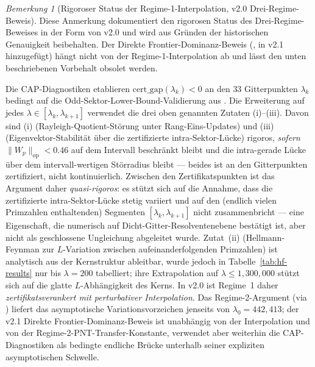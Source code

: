 ﻿\documentclass[12pt,a4paper]{article}
\theoremstyle{definition}
\theoremstyle{remark}
\newtheorem{remark}[theorem]{Bemerkung}
\begin{document}
\begin{remark}[Rigoroser Status der Regime-1-Interpolation, v2.0 Drei-Regime-Beweis]
\label{rem:regime1-caveat-de}
Diese Anmerkung dokumentiert den rigorosen Status des Drei-Regime-Beweises in der Form von v2.0 und wird aus Gründen der historischen Genauigkeit beibehalten. Der Direkte Frontier-Dominanz-Beweis (, in v2.1 hinzugefügt) hängt nicht von der Regime-1-Interpolation ab und lässt den unten beschriebenen Vorbehalt obsolet werden.

Die CAP-Diagnostiken etablieren $\mathrm{cert\_gap}(\lambda_k) < 0$ an den $33$ Gitterpunkten $\lambda_k$ bedingt auf die Odd-Sektor-Lower-Bound-Validierung aus . Die Erweiterung auf jedes $\lambda \in [\lambda_k, \lambda_{k+1}]$ verwendet die drei oben genannten Zutaten (i)--(iii). Davon sind (i) (Rayleigh-Quotient-Störung unter Rang-Eins-Updates) und (iii) (Eigenvektor-Stabilität über die zertifizierte intra-Sektor-Lücke) rigoros, \emph{sofern} $\|W_p\|_{\mathrm{op}} < 0.46$ auf dem Intervall beschränkt bleibt und die intra-gerade Lücke über dem intervall-wertigen Störradius bleibt --- beides ist an den Gitterpunkten zertifiziert, nicht kontinuierlich. Zwischen den Zertifikatspunkten ist das Argument daher \emph{quasi-rigoros}: es stützt sich auf die Annahme, dass die zertifizierte intra-Sektor-Lücke stetig variiert und auf den (endlich vielen Primzahlen enthaltenden) Segmenten $[\lambda_k, \lambda_{k+1}]$ nicht zusammenbricht --- eine Eigenschaft, die numerisch auf Dicht-Gitter-Resolventenebene bestätigt ist, aber nicht als geschlossene Ungleichung abgeleitet wurde. Zutat~(ii) (Hellmann-Feynman zur $L$-Variation zwischen aufeinanderfolgenden Primzahlen) ist analytisch aus der Kernstruktur ableitbar, wurde jedoch in Tabelle~\ref{tab:hf-results} nur bis $\lambda = 200$ tabelliert; ihre Extrapolation auf $\lambda \leq 1{,}300{,}000$ stützt sich auf die glatte $L$-Abhängigkeit des Kerns. In v2.0 ist Regime~1 daher \emph{zertifikatsverankert mit perturbativer Interpolation}. Das Regime-2-Argument (via ) liefert das asymptotische Variationsvorzeichen jenseits von $\lambda_0 = 442{,}413$; der v2.1 Direkte Frontier-Dominanz-Beweis ist unabhängig von der Interpolation und von der Regime-2-PNT-Transfer-Konstante, verwendet aber weiterhin die CAP-Diagnostiken als bedingte endliche Brücke unterhalb seiner expliziten asymptotischen Schwelle.
\end{remark}
\end{document}
